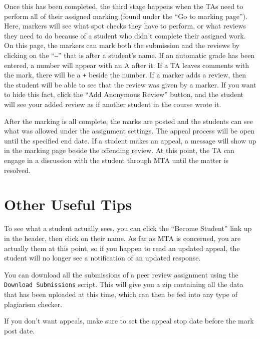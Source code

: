 \documentclass[11pt,letterpaper,oneside]{article}
\begin{document}
Once this has been completed,  the third stage happens when the TAs need to perform all of their assigned marking (found under the ``Go to marking page''). Here,  markers will see what spot checks they have to perform, or what reviews they need to do because of a student who didn't complete their assigned work. On this page,  the markers can mark both the submission and the reviews by clicking on the ``\texttt{--}'' that is after a student's name. If an automatic grade has been entered,  a number will appear with an A after it. If a TA leaves comments with the mark,  there will be a \texttt{+} beside the number. If a marker adds a review,  then the student will be able to see that the review was given by a marker. If you want to hide this fact,  click the ``Add Anonymous Review'' button,  and the student will see your added review as if another student in the course wrote it.

After the marking is all complete,  the marks are posted and the students can see what was allowed under the assignment settings. The appeal process will be open until the specified end date. If a student makes an appeal,  a message will show up in the marking page beside the offending review. At this point,  the TA can engage in a discussion with the student through MTA until the matter is resolved.

\section{Other Useful Tips}

To see what a student actually sees,  you can click the ``Become Student'' link up in the header,  then click on their name. As far as MTA is concerned, you are actually them at this point, so if you happen to read an updated appeal,  the student will no longer see a notification of an updated response.

You can download all the submissions of a peer review assignment using the \texttt{Download Submissions} script. This will give you a zip containing all the data that has been uploaded at this time,  which can then be fed into any type of plagiarism checker.

If you don't want appeals,  make sure to set the appeal stop date before the mark post date.
\end{document}
